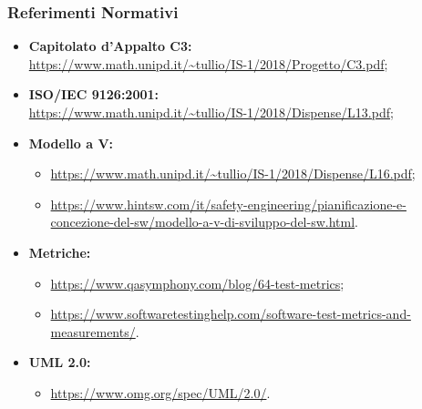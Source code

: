 \subsubsection{Referimenti Normativi}
\begin{itemize}
\item \textbf{Capitolato d'Appalto C3:}\\ \url{https://www.math.unipd.it/~tullio/IS-1/2018/Progetto/C3.pdf};
\item \textbf{ISO/IEC 9126:2001:}\\ \url{https://www.math.unipd.it/~tullio/IS-1/2018/Dispense/L13.pdf};
\item \textbf{Modello a V:}
\begin{itemize}
	\item \url{https://www.math.unipd.it/~tullio/IS-1/2018/Dispense/L16.pdf};
	\item \url{https://www.hintsw.com/it/safety-engineering/pianificazione-e-concezione-del-sw/modello-a-v-di-sviluppo-del-sw.html}.
\end{itemize}
\item \textbf{Metriche:}
	\begin{itemize}
	\item \url{https://www.qasymphony.com/blog/64-test-metrics};
	\item \url{https://www.softwaretestinghelp.com/software-test-metrics-and-measurements/}.
	\end{itemize}
\item \textbf{UML 2.0:}
\begin{itemize}
	\item \url{https://www.omg.org/spec/UML/2.0/}.
\end{itemize}

\end{itemize}

